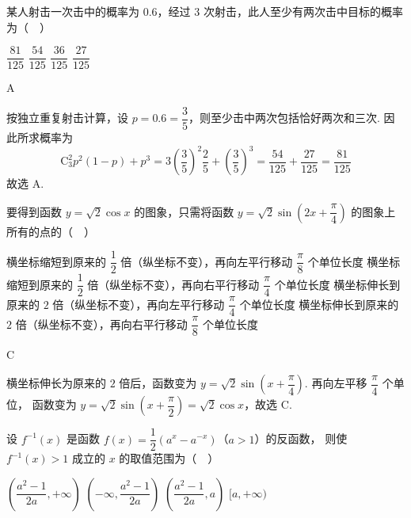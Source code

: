 \begin{problem}
某人射击一次击中的概率为 \(0.6\)，经过 \(3\) 次射击，此人至少有两次击中目标的概率为（\(\quad\)）

\choices
    {\(\dfrac{81}{125}\)}
    {\(\dfrac{54}{125}\)}
    {\(\dfrac{36}{125}\)}
    {\(\dfrac{27}{125}\)}
\end{problem}

\begin{answer}
A
\end{answer}

\begin{solution}
按独立重复射击计算，设 \(p=0.6=\dfrac35\)，则至少击中两次包括恰好两次和三次. 因此所求概率为
\[
\mathrm C_3^2p^2(1-p)+p^3
=3\left(\frac35\right)^2\frac25+\left(\frac35\right)^3
=\frac{54}{125}+\frac{27}{125}
=\frac{81}{125}
\]
故选 A.
\end{solution}

\begin{problem}
要得到函数 \(y=\sqrt2\cos x\) 的图象，只需将函数
\(y=\sqrt2\sin\left(2x+\dfrac\pi4\right)\) 的图象上所有的点的（\(\quad\)）

\choices
    {横坐标缩短到原来的 \(\dfrac12\) 倍（纵坐标不变），再向左平行移动 \(\dfrac\pi8\) 个单位长度}
    {横坐标缩短到原来的 \(\dfrac12\) 倍（纵坐标不变），再向右平行移动 \(\dfrac\pi4\) 个单位长度}
    {横坐标伸长到原来的 \(2\) 倍（纵坐标不变），再向左平行移动 \(\dfrac\pi4\) 个单位长度}
    {横坐标伸长到原来的 \(2\) 倍（纵坐标不变），再向右平行移动 \(\dfrac\pi8\) 个单位长度}
\end{problem}

\begin{answer}
C
\end{answer}

\begin{solution}
横坐标伸长为原来的 \(2\) 倍后，函数变为
\(y=\sqrt2\sin\left(x+\dfrac\pi4\right)\). 再向左平移 \(\dfrac\pi4\) 个单位，
函数变为 \(y=\sqrt2\sin\left(x+\dfrac\pi2\right)=\sqrt2\cos x\)，故选 C.
\end{solution}

\begin{problem}
设 \(f^{-1}(x)\) 是函数 \(f(x)=\dfrac12(a^x-a^{-x})\)（\(a>1\)）的反函数，
则使 \(f^{-1}(x)>1\) 成立的 \(x\) 的取值范围为（\(\quad\)）

\choices
    {\(\left(\dfrac{a^2-1}{2a},+\infty\right)\)}
    {\(\left(-\infty,\dfrac{a^2-1}{2a}\right)\)}
    {\(\left(\dfrac{a^2-1}{2a},a\right)\)}
    {\([a,+\infty)\)}
\end{problem}


